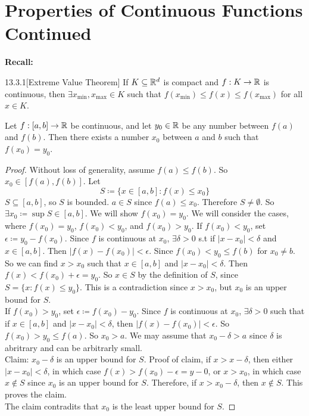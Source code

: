 \documentclass[openany]{report}
\begin{document}
\chapter{Properties of Continuous Functions Continued}
\textbf{Recall:}
\begin{manualcorollary}{13.3.1}[Extreme Value Theorem]
    If $K \subseteq \mathbb{R}^d$ is compact and $f: K \rightarrow \mathbb{R}$ is continuous, then $\exists x_{\min}, x_{\max} \in K$ such that $f(x_{\min}) \leq f(x) \leq f(x_{\max})$ for all $x \in K$.
\end{manualcorollary} 
\begin{theorem}
  Let $f: [a,b] \rightarrow \mathbb{R}$ be continuous, and let $y_0 \in \mathbb{R}$ be any number between $f(a)$ and $f(b)$. Then there exists a number $x_0$ between $a$ and $b$ such that $f(x_0) = y_0$.
\end{theorem}   
    \begin{proof}
        Without loss of generality, assume $f(a) \leq f(b)$. So $x_0 \in [f(a), f(b)]$. Let
        \[S \coloneqq \{x \in [a,b]: f(x) \leq x_0\}\]
        $S \subseteq [a,b]$, so $S$ is bounded. $a \in S$ since $f(a) \leq x_0$. Therefore $S \neq \emptyset$.
        So $\exists x_0 \coloneqq \sup S \in [a,b]$. We will show $f(x_0) = y_0$. We will consider the cases, where $f(x_0) = y_0$, $f(x_0) < y_0$, and $f(x_0) > y_0$. If $f(x_0) < y_0$, set $\epsilon \coloneqq y_0 - f(x_0)$. Since $f$ is continuous at $x_0$, $\exists \delta > 0$ s.t if $|x - x_0| < \delta$ and $x \in [a,b]$. Then $|f(x) - f(x_0)| < \epsilon$. Since $f(x_0) < y_0 \leq f(b)$ for $x_0 \neq b$. So we can find $x > x_0$ such that $x \in [a,b]$ and $|x - x_0| < \delta$.  Then $f(x) < f(x_0) + \epsilon = y_0$. So $x \in S$ by the definition of $S$, since $S = \{x: f(x) \leq y_0\}$. This is a contradiction since $x > x_0$, but $x_0$ is an upper bound for $S$.\\[2ex]
        If $f(x_0) > y_0$, set $\epsilon \coloneqq f(x_0) - y_0$. Since $f$ is continuous at $x_0$, $\exists \delta > 0$ such that if $x \in [a,b]$ and $|x - x_0| < \delta$, then $|f(x) - f(x_0)| < \epsilon$. So $f(x_0) > y_0 \leq f(a)$. So $x_0 > a$. We may assume that $x_0 - \delta > a$ since $\delta$ is abritrary and can be arbitrarly small. \\[1ex]
        Claim: $x_0 - \delta$ is an upper bound for $S$. Proof of claim, if $x > x - \delta$, then either $|x - x_0| < \delta$, in which case $f(x) > f(x_0)- \epsilon = y-0$, or $x > x_0$, in which case $x \not\in S$ since $x_0$ is an upper bound for $S$. Therefore, if $x > x_0 - \delta$, then $x \not\in S$. This proves the claim.\\[1ex]
        The claim contradits that $x_0$ is the least upper bound for $S$.  
    \end{proof}
\end{document}
